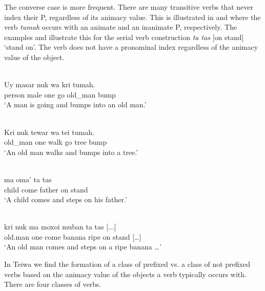  

  

  

The converse case is more frequent. There are many transitive verbs that never index their P, regardless of its animacy value. This is illustrated in  and  where the verb \textit{tumah} occurs with an animate and an inanimate P, respectively. The examples  and  illustrate this for the serial verb construction \textit{ta tas} [on stand] `stand on'. The verb does not have a pronominal index regardless of the animacy value of the object.


\ea%
\label{bkm:Ref306281423}
 \\ 
\gll  Uy    masar  nuk  wa    kri  tumah. \\  
   person  male  one  go  old\_man  bump  \\
\glt  `A man is going and bumps into an old man.'
\z
 

\ea 
\label{ex:10:1243}
 \\ 
 \gll   Kri  nuk  tewar  wa  tei  tumah.\\
old\_man  one  walk  go  tree  bump   \\
 \glt `An old man walks and bumps into a tree.'
\z

 
 
\ea%
\label{bkm:Ref383697393}
 \\ 
  ma  oma'  ta  tas\\  
    child  come  father  on  stand \\
\glt `A child comes and steps on his father.'
\z

 
 

\ea%
\label{bkm:Ref383697402}
 \\ 
\gll   kri   nuk  ma  moxoi  muban  ta  tas  [...]\\  
   old.man  one  come  banana  ripe  on  stand  [{\dots}]  \\
\glt `An old man comes and steps on a ripe banana {\dots}'
\z

 
 

      

In Teiwa  we find the formation of a class of prefixed vs. a class of not prefixed verbs  based on the animacy  value of the objects  a verb typically occurs with. There are four classes of verbs.

